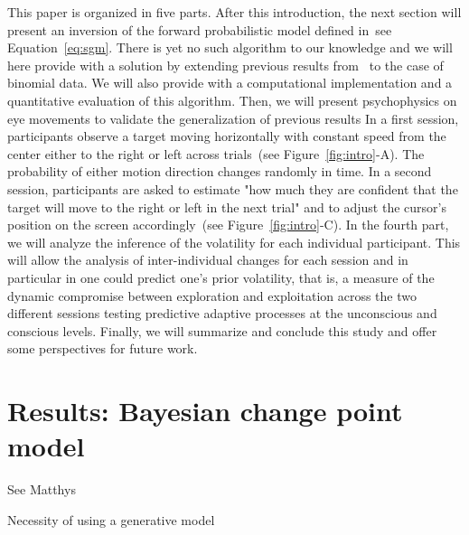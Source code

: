 \documentclass[profile,final,english, draft]{article}%
\newcommand{\citet}[1]{\textcite{#1}}
\newcommand{\seeFig}[1]{see Figure~\ref{fig:#1}}
\newcommand{\seeEq}[1]{see Equation~\ref{eq:#1}}
\begin{document}
This paper is organized in five parts.
After this introduction, the next section will present
an inversion of the forward probabilistic model defined in~\seeEq{sgm}.
There is yet no such algorithm to our knowledge and
we will here provide with a solution
by extending previous results from~\citet{AdamsMackay2007}
to the case of binomial data.
We will also provide with a computational implementation
and a quantitative evaluation of this algorithm.
Then, we will present psychophysics on eye movements
to validate the generalization of previous results
In a first session, participants observe a target moving horizontally
with constant speed from the center
either to the right or left across trials~(\seeFig{intro}-A).
The probability of either motion direction changes randomly in time.
In a second session, participants are asked to estimate
"how much they are confident that
the target will move to the right or left in the next trial" and
to adjust the cursor's position on the screen accordingly~(\seeFig{intro}-C).
In the fourth part, we will analyze the inference of the volatility
for each individual participant.
This will allow the analysis of inter-individual changes for each session
and in particular in one could predict one's prior volatility,
that is, a measure of the dynamic compromise between exploration and exploitation
across the two different sessions testing predictive adaptive processes
at the unconscious and conscious levels.
Finally, we will summarize and conclude this study and
offer some perspectives for future work.
\section{Results: Bayesian change point model}
\label{sec:switching_model}




See Matthys

Necessity of using a generative model
\end{document}
